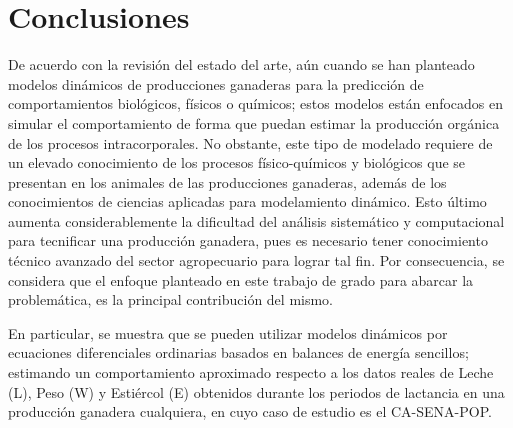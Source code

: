 

\section{Conclusiones}

De acuerdo con la revisión del estado del arte, aún cuando se han planteado modelos dinámicos de producciones ganaderas para la predicción de comportamientos biológicos, físicos o químicos; estos modelos están enfocados en simular el comportamiento de forma que puedan estimar la producción orgánica de los procesos intracorporales. No obstante, este tipo de modelado requiere de un elevado conocimiento de los procesos físico-químicos y biológicos que se presentan en los animales de las producciones ganaderas, además de los conocimientos de ciencias aplicadas para modelamiento dinámico. Esto último aumenta considerablemente la dificultad del análisis sistemático y computacional para tecnificar una producción ganadera, pues es necesario tener conocimiento técnico avanzado del sector agropecuario para lograr tal fin. Por consecuencia, se considera que el enfoque planteado en este trabajo de grado para abarcar la problemática, es la principal contribución del mismo.

En particular, se muestra que se pueden utilizar modelos dinámicos por ecuaciones diferenciales ordinarias basados en balances de energía sencillos; estimando un comportamiento aproximado  respecto a los datos reales de Leche (L), Peso (W) y Estiércol (E) obtenidos durante los periodos de lactancia en una producción ganadera cualquiera, en cuyo caso de estudio es el CA-SENA-POP.

